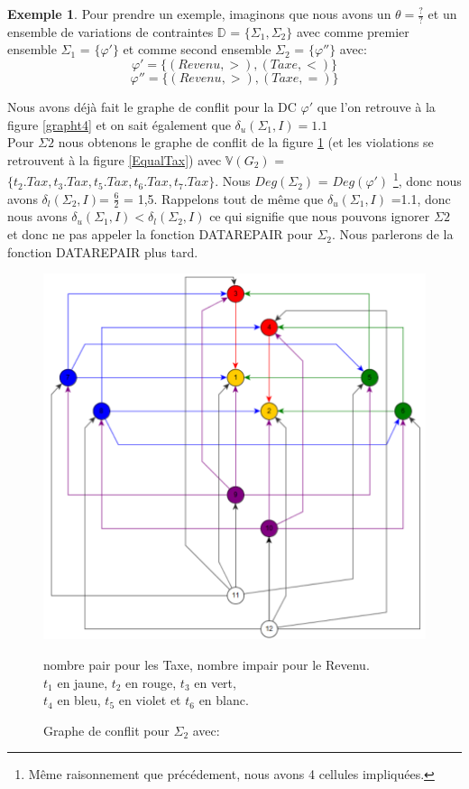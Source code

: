 \documentclass[letterpaper, 12pt]{report}
\theoremstyle{definition}
\newtheorem{myexample}{Exemple}
\begin{document}
\begin{myexample}

Pour prendre un exemple, imaginons que nous avons un $\theta = \frac{?}{?}$ et un ensemble de variations de contraintes $\mathbb{D}$ = $\{\Sigma_1,\Sigma_2\}$ avec comme premier ensemble $\Sigma_1$ = $\{\varphi'\}$ et comme second ensemble $\Sigma_2$ = $\{\varphi''\}$ avec:
$$ \varphi' = \{(Revenu,>),(Taxe,<) \} $$
$$ \varphi'' = \{(Revenu,>),(Taxe,=) \} $$

Nous avons déjà fait le graphe de conflit pour la DC $\varphi'$ que l'on retrouve à la figure \ref{grapht4} et on sait également que $\delta_u(\Sigma_1,I) =1.1$\\

Pour $\Sigma2$ nous obtenons le graphe de conflit de la figure \ref{graphSigma2} (et les violations se retrouvent à la figure \ref{EqualTax}) avec $\mathbb{V}(G_2)$ = $\{ t_2.Tax,t_3.Tax,t_5.Tax,t_6.Tax,t_7.Tax\}$. Nous $Deg(\Sigma_2)$ = $Deg(\varphi')$ \footnote{Même raisonnement que précédement, nous avons 4 cellules impliquées.}, donc nous avons $\delta_l(\Sigma_2,I)$= $\frac{6}{2}$ = 1,5. Rappelons tout de même que $\delta_u(\Sigma_1,I)$ =1.1, donc nous avons $\delta_u(\Sigma_1,I) < \delta_l(\Sigma_2,I)$ ce qui signifie que nous pouvons ignorer $\Sigma2$ et donc ne pas appeler la fonction DATAREPAIR pour $\Sigma_2$. Nous parlerons de la fonction DATAREPAIR plus tard.



\begin{figure}
\centering
\hspace*{-1.8cm} \includegraphics[scale=0.465]{img/graph2}
\caption{\label{graphSigma2}Graphe de conflit pour $\Sigma_2$ avec:}
	nombre pair pour les Taxe, nombre impair pour le Revenu. \\
	$t_1$ en jaune, $t_2$ en rouge, $t_3$ en vert,\\
	$t_4$ en bleu, $t_5$ en violet et $t_6$ en blanc.
\end{figure}


\end{myexample}
\end{document}

